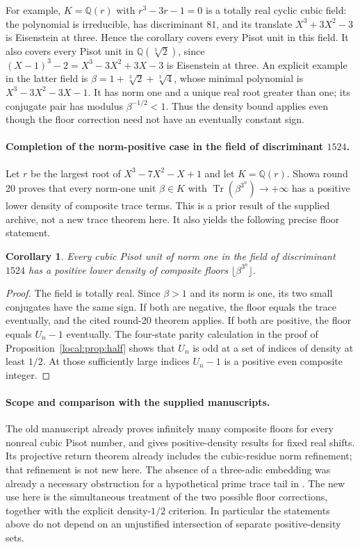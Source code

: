 \documentclass[11pt,a4paper]{article}
\newtheorem{corollary}[theorem]{Corollary}
\theoremstyle{remark}\newtheorem{remark}[theorem]{Remark}
\begin{document}
For example, $K=\mathbb Q(r)$ with $r^3-3r-1=0$ is a totally
real cyclic cubic field: the polynomial is irreducible, has
discriminant $81$, and its translate
$X^3+3X^2-3$ is Eisenstein at three. Hence the corollary covers
every Pisot unit in this field. It also covers every Pisot unit in
$\mathbb Q(\sqrt[3]{2})$, since
$(X-1)^3-2=X^3-3X^2+3X-3$ is Eisenstein at three.
An explicit example in the latter field is
$\beta=1+\sqrt[3]{2}+\sqrt[3]{4}$, whose minimal polynomial is
$X^3-3X^2-3X-1$. It has norm one and a unique real root greater
than one; its conjugate pair has modulus $\beta^{-1/2}<1$.
Thus the density bound applies even though the floor correction
need not have an eventually constant sign.

\paragraph{Completion of the norm-positive case in the field of
discriminant $1524$.}
Let $r$ be the largest root of $X^3-7X^2-X+1$ and let
$K=\mathbb Q(r)$. Showa round 20 proves that every norm-one unit
$\beta\in K$ with $\operatorname{Tr}(\beta^{3^n})\to+\infty$
has a positive lower density of composite trace terms. This is a
prior result of the supplied archive, not a new trace theorem here.
It also yields the following precise floor statement.

\begin{corollary}\label{local:cor:1524}
Every cubic Pisot unit of norm one in the field of discriminant
$1524$ has a positive lower density of composite floors
$\lfloor\beta^{3^n}\rfloor$.
\end{corollary}
\begin{proof}
The field is totally real. Since $\beta>1$ and its norm is one,
its two small conjugates have the same sign. If both are negative,
the floor equals the trace eventually, and the cited round-20
theorem applies. If both are positive, the floor equals $U_n-1$
eventually. The four-state parity calculation in the proof of
Proposition~\ref{local:prop:half} shows that $U_n$ is odd at a
set of indices of density at least $1/2$. At those sufficiently
large indices $U_n-1$ is a positive even composite integer.
\end{proof}

\paragraph{Scope and comparison with the supplied manuscripts.}
The old manuscript \cite{Keio009} already proves infinitely many
composite floors for every nonreal cubic Pisot number, and gives
positive-density results for fixed real shifts. Its projective
return theorem already includes the cubic-residue norm refinement;
that refinement is not new here. The absence of a three-adic
embedding was already a necessary obstruction for a hypothetical
prime trace tail in \cite{Keio031}. The new use here is the
simultaneous treatment of the two possible floor corrections,
together with the explicit density-$1/2$ criterion. In particular
the statements above do not depend on an unjustified intersection
of separate positive-density sets.
\end{document}
